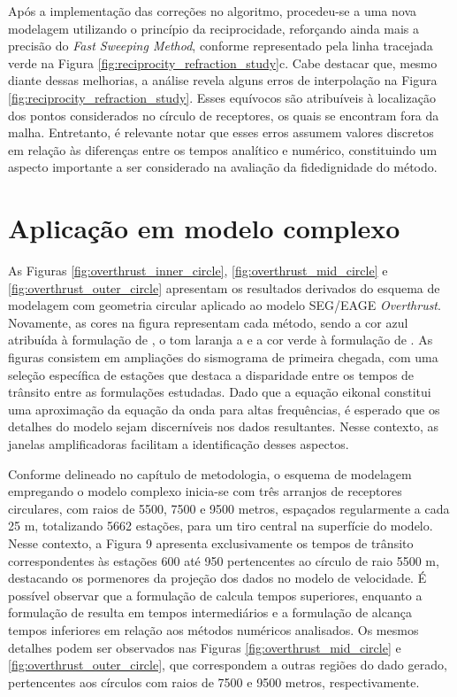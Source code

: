 Após a implementação das correções no algoritmo, procedeu-se a uma nova modelagem utilizando o princípio da reciprocidade, reforçando ainda mais a precisão do \textit{Fast Sweeping Method}, conforme representado pela linha tracejada verde na Figura \ref{fig:reciprocity_refraction_study}c. Cabe destacar que, mesmo diante dessas melhorias, a análise revela alguns erros de interpolação na Figura \ref{fig:reciprocity_refraction_study}. Esses equívocos são atribuíveis à localização dos pontos considerados no círculo de receptores, os quais se encontram fora da malha. Entretanto, é relevante notar que esses erros assumem valores discretos em relação às diferenças entre os tempos analítico e numérico, constituindo um aspecto importante a ser considerado na avaliação da fidedignidade do método.

\section{Aplicação em modelo complexo}

As Figuras \ref{fig:overthrust_inner_circle}, \ref{fig:overthrust_mid_circle} e \ref{fig:overthrust_outer_circle} apresentam os resultados derivados do esquema de modelagem com geometria circular aplicado ao modelo SEG/EAGE \textit{Overthrust}. Novamente, as cores na figura representam cada método, sendo a cor azul atribuída à formulação de , o tom laranja a  e a cor verde à formulação de . As figuras consistem em ampliações do sismograma de primeira chegada, com uma seleção específica de estações que destaca a disparidade entre os tempos de trânsito entre as formulações estudadas. Dado que a equação eikonal constitui uma aproximação da equação da onda para altas frequências, é esperado que os detalhes do modelo sejam discerníveis nos dados resultantes. Nesse contexto, as janelas amplificadoras facilitam a identificação desses aspectos.

Conforme delineado no capítulo de metodologia, o esquema de modelagem empregando o modelo complexo inicia-se com três arranjos de receptores circulares, com raios de 5500, 7500 e 9500 metros, espaçados regularmente a cada 25 m, totalizando 5662 estações, para um tiro central na superfície do modelo. Nesse contexto, a Figura 9 apresenta exclusivamente os tempos de trânsito correspondentes às estações 600 até 950 pertencentes ao círculo de raio 5500 m, destacando os pormenores da projeção dos dados no modelo de velocidade. É possível observar que a formulação de  calcula tempos superiores, enquanto a formulação de  resulta em tempos intermediários e a formulação de  alcança tempos inferiores em relação aos métodos numéricos analisados. Os mesmos detalhes podem ser observados nas Figuras \ref{fig:overthrust_mid_circle} e \ref{fig:overthrust_outer_circle}, que correspondem a outras regiões do dado gerado, pertencentes aos círculos com raios de 7500 e 9500 metros, respectivamente.

